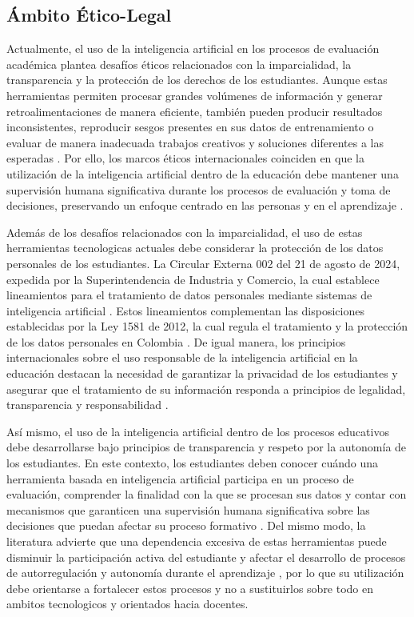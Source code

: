 \documentclass[letterpaper, 10 pt, conference]{ieeeconf}  %
\begin{document}
    \subsection{Ámbito Ético-Legal} 
    Actualmente, el uso de la inteligencia artificial en los procesos de evaluación académica plantea desafíos éticos relacionados con la imparcialidad, la transparencia y la protección de los derechos de los estudiantes. Aunque estas herramientas permiten procesar grandes volúmenes de información y generar retroalimentaciones de manera eficiente, también pueden producir resultados inconsistentes, reproducir sesgos presentes en sus datos de entrenamiento o evaluar de manera inadecuada trabajos creativos y soluciones diferentes a las esperadas \cite{12}. Por ello, los marcos éticos internacionales coinciden en que la utilización de la inteligencia artificial dentro de la educación debe mantener una supervisión humana significativa durante los procesos de evaluación y toma de decisiones, preservando un enfoque centrado en las personas y en el aprendizaje \cite{5}.

    Además de los desafíos relacionados con la imparcialidad, el uso de estas herramientas tecnologicas actuales debe considerar la protección de los datos personales de los estudiantes. La Circular Externa 002 del 21 de agosto de 2024, expedida por la Superintendencia de Industria y Comercio, la cual establece lineamientos para el tratamiento de datos personales mediante sistemas de inteligencia artificial \cite{3}. Estos lineamientos complementan las disposiciones establecidas por la Ley 1581 de 2012, la cual regula el tratamiento y la protección de los datos personales en Colombia \cite{4}. De igual manera, los principios internacionales sobre el uso responsable de la inteligencia artificial en la educación destacan la necesidad de garantizar la privacidad de los estudiantes y asegurar que el tratamiento de su información responda a principios de legalidad, transparencia y responsabilidad \cite{18}.

    Así mismo, el uso de la inteligencia artificial dentro de los procesos educativos debe desarrollarse bajo principios de transparencia y respeto por la autonomía de los estudiantes. En este contexto, los estudiantes deben conocer cuándo una herramienta basada en inteligencia artificial participa en un proceso de evaluación, comprender la finalidad con la que se procesan sus datos y contar con mecanismos que garanticen una supervisión humana significativa sobre las decisiones que puedan afectar su proceso formativo \cite{18}. Del mismo modo, la literatura advierte que una dependencia excesiva de estas herramientas puede disminuir la participación activa del estudiante y afectar el desarrollo de procesos de autorregulación y autonomía durante el aprendizaje \cite{19}, por lo que su utilización debe orientarse a fortalecer estos procesos y no a sustituirlos sobre todo en ambitos tecnologicos y orientados hacia docentes.
\end{document}
